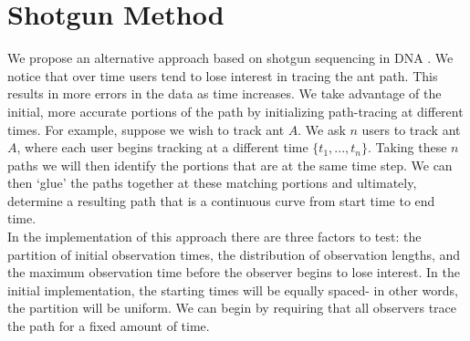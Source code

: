 \documentclass[12pt]{article}
\begin{document}
%
%
%
%
%

\section{Shotgun Method}
\indent We propose an alternative approach based on shotgun sequencing in DNA \cite{Anson10}. We notice that over time users tend to lose interest in tracing the ant path. This results in more errors in the data as time increases. We take advantage of the initial, more accurate portions of the path by initializing path-tracing at different times. For example, suppose we wish to track ant $A$. We ask $n$ users to track ant $A$, where each user begins tracking at a different time $\{t_1,...,t_n\}$. Taking these $n$ paths we will then identify the portions that are at the same time step. We can then `glue' the paths together at these matching portions and ultimately, determine a resulting path that is a continuous curve from start time to end time.\\
\indent In the implementation of this approach there are three factors to test: the partition of initial observation times, the distribution of observation lengths, and the maximum observation time before the observer begins to lose interest. In the initial implementation, the starting times will be equally spaced- in other words, the partition will be uniform. We can begin by requiring that all observers trace the path for a fixed amount of time. \\
\end{document}
